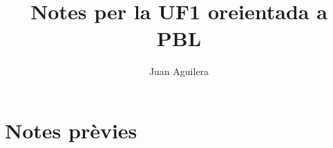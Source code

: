 \documentclass[a4paper]{article}
\begin{document}
\title{Notes per la UF1 oreientada a PBL}
\author{Juan Aguilera}
\maketitle

\section{Notes prèvies}
\end{document}
